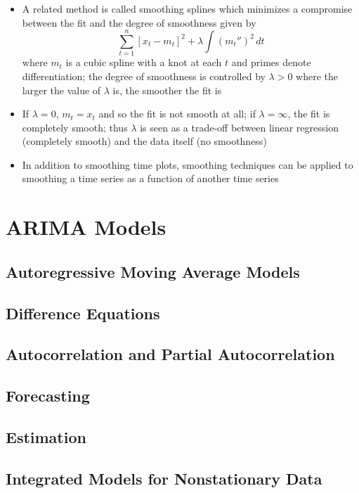 \documentclass[12pt]{article}
\begin{document}
\begin{itemize}
\item A related method is called smoothing splines which minimizes a compromise between the fit and the degree of smoothness given by $$ \sum_{t=1}^n [x_t - m_t]^2 + \lambda \int (m_t'')^2 \, dt $$ where $m_t$ is a cubic spline with a knot at each $t$ and primes denote differentiation; the degree of smoothness is controlled by $\lambda > 0$ where the larger the value of $\lambda$ is, the smoother the fit is 
\item If $\lambda = 0$, $m_t = x_t$ and so the fit is not smooth at all; if $\lambda = \infty$, the fit is completely smooth; thus $\lambda$ is seen as a trade-off between linear regression (completely smooth) and the data itself (no smoothness)
\item In addition to smoothing time plots, smoothing techniques can be applied to smoothing a time series as a function of another time series 
\end{itemize} \newpage

\section{ARIMA Models}
\subsection{Autoregressive Moving Average Models}

\subsection{Difference Equations}

\subsection{Autocorrelation and Partial Autocorrelation}

\subsection{Forecasting}

\subsection{Estimation}

\subsection{Integrated Models for Nonstationary Data}
\end{document}

